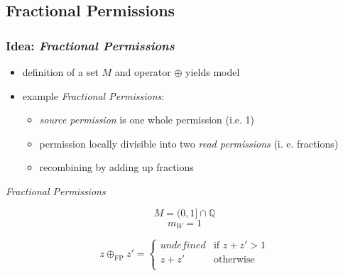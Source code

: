 \documentclass{beamer}
\begin{document}
	\subsection{Fractional Permissions}
	\begin{frame}
	\frametitle{Idea: \emph{Fractional Permissions}}
	\begin{itemize}
		\item definition of a set $M$ and operator $\oplus$ yields model
		\item example \emph{Fractional Permissions}:
		\begin{itemize}
			\item \emph{source permission} is one whole permission (i.e. 1)
			\item permission locally divisible into two \emph{read permissions} (i. e. fractions)
			\item recombining by adding up fractions
		\end{itemize}
	\end{itemize}
	\vspace{-0.1cm}
	\begin{block}{\emph{Fractional Permissions}}
		\vspace{-0.4cm}
		\begin{minipage}{0.35\textwidth}
			$$M = (0,1]\cap\mathbb{Q}$$
			$$m_W = 1$$
		\end{minipage}\noindent
		\begin{minipage}{0.65\textwidth}
			$$z\oplus_\text{FP} z' =
			\begin{cases}
				\textit{undefined} &\text{if $z + z' > 1$}\\
				z + z'             &\text{otherwise}\\
			\end{cases}
			$$
		\end{minipage}
	\end{block}
	\end{frame}
\end{document}

